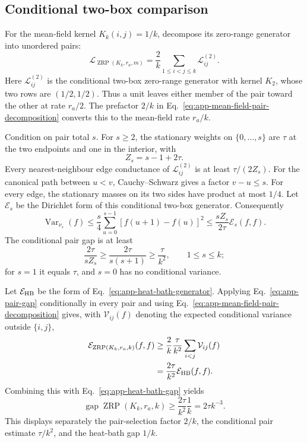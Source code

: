 \subsection{Conditional two-box comparison}
\label{app:mean-field-comparison}

For the mean-field kernel $K_k(i,j)=1/k$, decompose its zero-range generator
into unordered pairs:
\begin{equation}
 \mathcal L_{\operatorname{ZRP}(K_k,r_a,m)}
 =\frac2k\sum_{1\leq i<j\leq k}\mathcal L_{ij}^{(2)}.
 \label{eq:app-mean-field-pair-decomposition}
\end{equation}
Here $\mathcal L_{ij}^{(2)}$ is the conditional two-box zero-range generator
with kernel $K_2$, whose two rows are $(1/2,1/2)$.  Thus a unit leaves either
member of the pair toward the other at rate $r_a/2$.  The prefactor $2/k$
in Eq.~\eqref{eq:app-mean-field-pair-decomposition} converts this to the
mean-field rate $r_a/k$.

Condition on pair total $s$.  For $s\geq2$, the stationary weights on
$\{0,\ldots,s\}$ are $\tau$ at the two endpoints and one in the interior,
with
\begin{equation}
 Z_s=s-1+2\tau.
\end{equation}
Every nearest-neighbour edge conductance of
$\mathcal L_{ij}^{(2)}$ is at least $\tau/(2Z_s)$.  For the canonical path
between $u<v$, Cauchy--Schwarz gives a factor $v-u\leq s$.  For every edge,
the stationary masses on its two sides have product at most $1/4$.
Let $\mathcal E_s$ be the Dirichlet form of this conditional two-box
generator.  Consequently
\begin{equation}
 \operatorname{Var}_{\nu_s}(f)
 \leq\frac{s}{4}\sum_{u=0}^{s-1}[f(u+1)-f(u)]^2
 \leq\frac{sZ_s}{2\tau}\mathcal E_s(f,f).
 \label{eq:app-pair-poincare}
\end{equation}
The conditional pair gap is at least
\begin{equation}
 \frac{2\tau}{sZ_s}
 \geq\frac{2\tau}{s(s+1)}
 \geq\frac{\tau}{k^2},
 \qquad 1\leq s\leq k;
 \label{eq:app-pair-gap}
\end{equation}
for $s=1$ it equals $\tau$, and $s=0$ has no conditional variance.

Let $\mathcal E_{\rm HB}$ be the form of
Eq.~\eqref{eq:app-heat-bath-generator}.  Applying
Eq.~\eqref{eq:app-pair-gap} conditionally in every pair and using
Eq.~\eqref{eq:app-mean-field-pair-decomposition} gives, with
$\mathcal V_{ij}(f)$ denoting the expected conditional variance outside
$\{i,j\}$,
\begin{align}
 \mathcal E_{\operatorname{ZRP}(K_k,r_a,k)}(f,f)
 &\geq\frac2k\frac{\tau}{k^2}
 \sum_{i<j}\mathcal V_{ij}(f)
 \\
 &=\frac{2\tau}{k^2}\mathcal E_{\rm HB}(f,f).
 \label{eq:app-zrp-heat-bath-form-comparison}
\end{align}
Combining this with Eq.~\eqref{eq:app-heat-bath-gap} yields
\begin{equation}
 \operatorname{gap}\operatorname{ZRP}(K_k,r_a,k)
 \geq\frac{2\tau}{k^2}\frac1k
 =2\tau k^{-3}.
 \label{eq:app-mean-field-gap-final}
\end{equation}
This displays separately the pair-selection factor $2/k$, the conditional
pair estimate $\tau/k^2$, and the heat-bath gap $1/k$.

